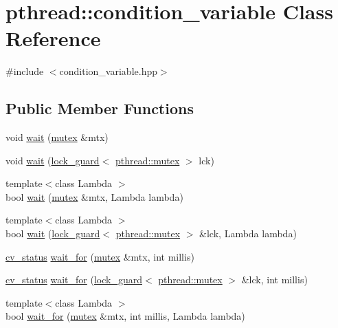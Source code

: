 \hypertarget{classpthread_1_1condition__variable}{}\section{pthread\+:\+:condition\+\_\+variable Class Reference}
\label{classpthread_1_1condition__variable}


{\ttfamily \#include $<$condition\+\_\+variable.\+hpp$>$}

\subsection*{Public Member Functions}
\begin{DoxyCompactItemize}
\item 
void \hyperlink{classpthread_1_1condition__variable_a34247dacb9da1856f3a65bc868b6abb8}{wait} (\hyperlink{classpthread_1_1mutex}{mutex} \&mtx)
\item 
void \hyperlink{classpthread_1_1condition__variable_a9bb3e49f17ec1470c305d8b21daadf2a}{wait} (\hyperlink{classpthread_1_1lock__guard}{lock\+\_\+guard}$<$ \hyperlink{classpthread_1_1mutex}{pthread\+::mutex} $>$ lck)
\item 
{\footnotesize template$<$class Lambda $>$ }\\bool \hyperlink{classpthread_1_1condition__variable_a251a506415355171be3052b68bc8d2ec}{wait} (\hyperlink{classpthread_1_1mutex}{mutex} \&mtx, Lambda lambda)
\item 
{\footnotesize template$<$class Lambda $>$ }\\bool \hyperlink{classpthread_1_1condition__variable_a7b6c075d1588178301547bc60c59ceba}{wait} (\hyperlink{classpthread_1_1lock__guard}{lock\+\_\+guard}$<$ \hyperlink{classpthread_1_1mutex}{pthread\+::mutex} $>$ \&lck, Lambda lambda)
\item 
\hyperlink{namespacepthread_a823f88a2bf448bd5bd5273b826830bdd}{cv\+\_\+status} \hyperlink{classpthread_1_1condition__variable_a804a305eefb4da8abecd1e6326b82785}{wait\+\_\+for} (\hyperlink{classpthread_1_1mutex}{mutex} \&mtx, int millis)
\item 
\hyperlink{namespacepthread_a823f88a2bf448bd5bd5273b826830bdd}{cv\+\_\+status} \hyperlink{classpthread_1_1condition__variable_a1dfcedf00e9822587c7b20da9c060fd9}{wait\+\_\+for} (\hyperlink{classpthread_1_1lock__guard}{lock\+\_\+guard}$<$ \hyperlink{classpthread_1_1mutex}{pthread\+::mutex} $>$ \&lck, int millis)
\item 
{\footnotesize template$<$class Lambda $>$ }\\bool \hyperlink{classpthread_1_1condition__variable_a82fb3ff516ffef37c68f58e277fad855}{wait\+\_\+for} (\hyperlink{classpthread_1_1mutex}{mutex} \&mtx, int millis, Lambda lambda)

\end{DoxyCompactItemize}
